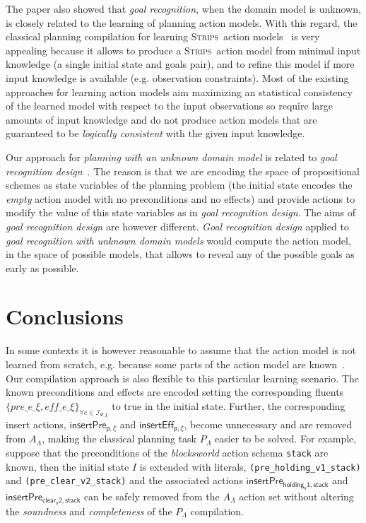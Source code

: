 \documentclass[letterpaper]{article} %
\newcommand{\strips}{\textsc{Strips}}     %
\begin{document}
The paper also showed that {\em goal recognition}, when the domain model is unknown, is closely related to the learning of planning action models. With this regard, the classical planning compilation for learning \strips\ action models~\cite{aineto2018learning} is very appealing because it allows to produce a \strips\ action model from minimal input knowledge (a single initial state and goals pair), and to refine this model if more input knowledge is available (e.g. observation constraints). Most of the existing approaches for learning action models aim maximizing an statistical consistency of the learned model with respect to the input observations so require large amounts of input knowledge and do not produce action models that are guaranteed to be {\em logically consistent} with the given input knowledge.

Our approach for {\em planning with an unknown domain model} is related to {\em goal recognition design}~\cite{KerenGK14}. The reason is that we are encoding the space of propositional schemes as state variables of the planning problem (the initial state encodes the {\em empty} action model with no preconditions and no effects) and provide actions to modify the value of this state variables as in {\em goal recognition design}. The aims of {\em goal recognition design} are however different. {\em Goal recognition design} applied to {\em goal recognition with unknown domain models} would compute the action model, in the space of possible models, that allows to reveal any of the possible goals as early as possible.



\section{Conclusions}
\label{sec:conclusions}
In some contexts it is however reasonable to assume that the action model is not learned from scratch, e.g. because some parts of the action model are known~\cite{ZhuoNK13,sreedharan2018handling,pereira2018heuristic}. Our compilation approach is also flexible to this particular learning scenario. The known preconditions and effects are encoded setting the corresponding fluents $\{pre\_e\_\xi, eff\_e\_\xi\}_{\forall e\in{\mathcal I}_{\Psi,\xi}}$ to true in the initial state. Further, the corresponding insert actions, $\mathsf{insertPre_{p,\xi}}$ and $\mathsf{insertEff_{p,\xi}}$, become unnecessary and are removed from $A_{\Lambda}$, making the classical planning task $P_{\Lambda}$ easier to be solved. For example, suppose that the preconditions of the {\em blocksworld} action schema {\tt stack} are known, then the initial state $I$ is extended with literals, {\small\tt(pre\_holding\_v1\_stack)} and {\small\tt(pre\_clear\_v2\_stack)} and the associated actions $\mathsf{insertPre_{holding_v1,stack}}$ and $\mathsf{insertPre_{clear_v2,stack}}$ can be safely removed from the $A_{\Lambda}$ action set without altering the {\em soundness} and {\em completeness} of the $P_{\Lambda}$ compilation.
\end{document}
